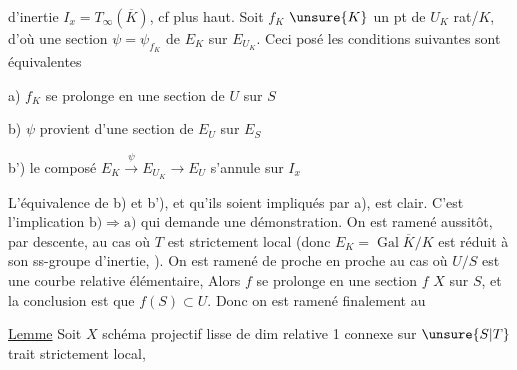 d'inertie $I_x=T_\infty(\overline K)$, cf plus haut. Soit $f_K$ $\unsure{K}$ un pt de $U_K$ rat/$K$, d'où une section $\psi=\psi_{f_K}$ de $E_K$ sur $E_{U_K}$. Ceci posé les conditions suivantes sont équivalentes

\noindent a) $f_K$ se prolonge en une section de $U$ sur $S$

\noindent b) $\psi$ provient d'une section de $E_U$ sur $E_S$

\noindent b') le composé $E_K\xrightarrow{\psi}E_{U_K}\longrightarrow E_U$ s'annule sur $I_x$


L'équivalence de b) et b'), et qu'ils soient impliqués par a), est clair. C'est l'implication $\mathrm{b)}\Longrightarrow\mathrm{a)}$ qui demande une démonstration. On est ramené aussitôt, par descente, au cas  où $T$ est strictement local (donc $E_K=\operatorname{Gal}\overline K/K$ est réduit à son ss-groupe d'inertie, ). On est ramené de proche en proche au cas où $U/S$ est une courbe relative élémentaire,   Alors $f$ se prolonge en une section $f$  $X$ sur $S$, et la conclusion est que $f(S)\subset U$. Donc on est ramené finalement au

\uline{Lemme} Soit $X$ schéma projectif lisse de dim relative 1 connexe sur $\unsure{S|T}$ trait strictement local,
